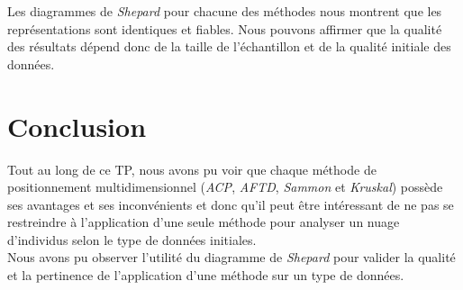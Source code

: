 \documentclass[a4paper, 10pt]{article}
\begin{document}
Les diagrammes de \textit{Shepard} pour chacune des méthodes nous montrent que les représentations sont identiques et fiables.
Nous pouvons affirmer que la qualité des résultats dépend donc de la taille de l'échantillon et de la qualité initiale des données.

\section*{Conclusion}
Tout au long de ce TP, nous avons pu voir que chaque méthode de positionnement multidimensionnel (\textit{ACP}, \textit{AFTD},
\textit{Sammon} et \textit{Kruskal}) possède ses avantages et ses inconvénients et donc qu'il peut être intéressant
de ne pas se restreindre à l'application d'une seule méthode pour analyser un nuage d'individus selon le type de données initiales.\\
Nous avons pu observer l'utilité du diagramme de \textit{Shepard} pour valider la qualité et la pertinence de l'application d'une méthode
sur un type de données.
\end{document}
